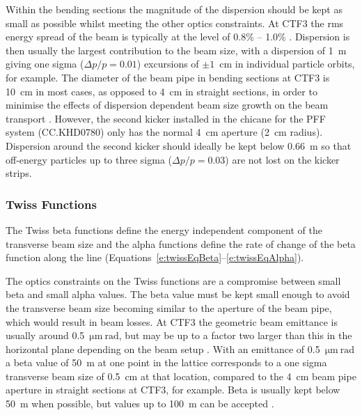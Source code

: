 Within the bending sections the magnitude of the dispersion should be kept as small as possible whilst meeting the other optics constraints. At CTF3 the rms energy spread of the beam is typically at the  level of 0.8\% -- 1.0\% \cite{CTF3}. Dispersion is then usually the largest contribution to the beam size, with a dispersion of 1~m giving one sigma (\(\Delta p/p=0.01\)) excursions of \(\pm1\)~cm in individual particle orbits, for example. The diameter of the beam pipe in bending sections at CTF3 is 10~cm in most cases, as opposed to 4~cm in straight sections, in order to minimise the effects of dispersion dependent beam size growth on the beam transport \cite{CTF3}. However, the second kicker installed in the chicane for the PFF system (CC.KHD0780) only has the normal 4~cm aperture (2~cm radius).  Dispersion around the second kicker should ideally be kept below 0.66~m so that off-energy particles up to three sigma (\(\Delta p/p=0.03\)) are not lost on the kicker strips.

\subsubsection{Twiss Functions}


The Twiss beta functions define the energy independent component of the transverse beam size and the alpha functions define the rate of change of the beta function along the line (Equations~\ref{e:twissEqBeta}--\ref{e:twissEqAlpha}). %

The optics constraints on the Twiss functions are a compromise between small beta and small alpha values. The beta value must be kept small enough to avoid the transverse beam size becoming similar to the aperture of the beam pipe, which would result in beam losses. At CTF3 the geometric beam emittance is usually around 0.5~\(\mathrm{\mu m~rad}\), but may be up to a factor two larger than this in the horizontal plane depending on the beam setup \cite{davideThesis}. With an emittance of 0.5~\(\mathrm{\mu m~rad}\) a beta value of 50~m at one point in the lattice corresponds to a one sigma transverse beam size of 0.5~cm at that location, compared to the 4~cm beam pipe aperture in straight sections at CTF3, for example. Beta is usually kept below 50~m when possible, but values up to 100~m can be accepted \cite{piotrPriv}. 


